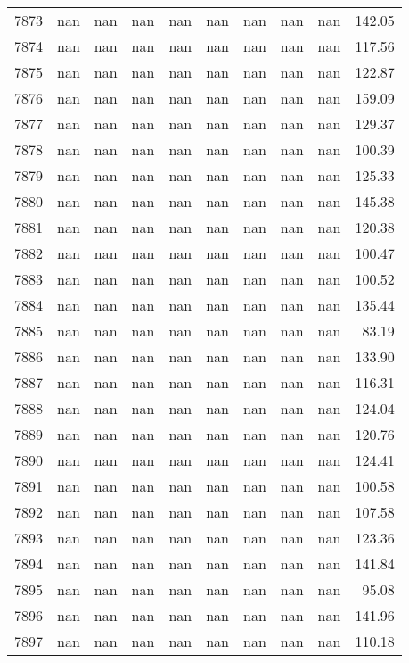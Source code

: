 \begin{tabular}{lrrrrrrrrr}
7873 & nan & nan & nan & nan & nan & nan & nan & nan & 142.05 \\
7874 & nan & nan & nan & nan & nan & nan & nan & nan & 117.56 \\
7875 & nan & nan & nan & nan & nan & nan & nan & nan & 122.87 \\
7876 & nan & nan & nan & nan & nan & nan & nan & nan & 159.09 \\
7877 & nan & nan & nan & nan & nan & nan & nan & nan & 129.37 \\
7878 & nan & nan & nan & nan & nan & nan & nan & nan & 100.39 \\
7879 & nan & nan & nan & nan & nan & nan & nan & nan & 125.33 \\
7880 & nan & nan & nan & nan & nan & nan & nan & nan & 145.38 \\
7881 & nan & nan & nan & nan & nan & nan & nan & nan & 120.38 \\
7882 & nan & nan & nan & nan & nan & nan & nan & nan & 100.47 \\
7883 & nan & nan & nan & nan & nan & nan & nan & nan & 100.52 \\
7884 & nan & nan & nan & nan & nan & nan & nan & nan & 135.44 \\
7885 & nan & nan & nan & nan & nan & nan & nan & nan & 83.19 \\
7886 & nan & nan & nan & nan & nan & nan & nan & nan & 133.90 \\
7887 & nan & nan & nan & nan & nan & nan & nan & nan & 116.31 \\
7888 & nan & nan & nan & nan & nan & nan & nan & nan & 124.04 \\
7889 & nan & nan & nan & nan & nan & nan & nan & nan & 120.76 \\
7890 & nan & nan & nan & nan & nan & nan & nan & nan & 124.41 \\
7891 & nan & nan & nan & nan & nan & nan & nan & nan & 100.58 \\
7892 & nan & nan & nan & nan & nan & nan & nan & nan & 107.58 \\
7893 & nan & nan & nan & nan & nan & nan & nan & nan & 123.36 \\
7894 & nan & nan & nan & nan & nan & nan & nan & nan & 141.84 \\
7895 & nan & nan & nan & nan & nan & nan & nan & nan & 95.08 \\
7896 & nan & nan & nan & nan & nan & nan & nan & nan & 141.96 \\
7897 & nan & nan & nan & nan & nan & nan & nan & nan & 110.18 \\

\end{tabular}
